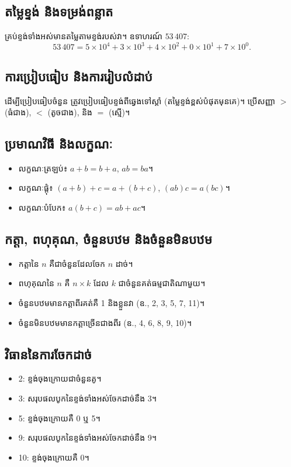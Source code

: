 \subsection{តម្លៃខ្ទង់ និងទម្រង់ពន្លាត}
គ្រប់ខ្ទង់ទាំងអស់មានតម្លៃតាមខ្ទង់របស់វា។ ឧទាហរណ៍ $53\,407$:
    \[
        53\,407 = 5\times10^4 + 3\times10^3 + 4\times10^2 + 0\times10^1 + 7\times10^0.
    \]

\subsection{ការប្រៀបធៀប និងការរៀបលំដាប់}
ដើម្បីប្រៀបធៀបចំនួន ត្រូវប្រៀបធៀបខ្ទង់ពីឆ្វេងទៅស្តាំ (តម្លៃខ្ទង់ខ្ពស់បំផុតមុនគេ)។ ប្រើសញ្ញា $>$ (ធំជាង), $<$ (តូចជាង), និង $=$ (ស្មើ)។

\subsection{ប្រមាណវិធី និងលក្ខណៈ}
    \begin{itemize}[label=---,nosep]
        \item លក្ខណៈត្រឡប់៖ $a+b=b+a$, $ab=ba$។
        \item លក្ខណៈផ្ដុំ៖ $(a+b)+c=a+(b+c)$, $(ab)c=a(bc)$។
        \item លក្ខណៈបំបែក៖ $a(b+c)=ab+ac$។
    \end{itemize}

\subsection{កត្តា, ពហុគុណ, ចំនួនបឋម និងចំនួនមិនបឋម}
    \begin{itemize}[label=---,nosep]
        \item កត្តានៃ $n$ គឺជាចំនួនដែលចែក $n$ ដាច់។
        \item ពហុគុណនៃ $n$ គឺ $n\times k$ ដែល $k$ ជាចំនួនគត់ធម្មជាតិណាមួយ។
        \item ចំនួនបឋមមានកត្តាពីរគត់គឺ 1 និងខ្លួនវា (ឧ., 2, 3, 5, 7, 11)។
        \item ចំនួនមិនបឋមមានកត្តាច្រើនជាងពីរ (ឧ., 4, 6, 8, 9, 10)។
    \end{itemize}

\subsection{វិធាននៃការចែកដាច់}
    \begin{itemize}[label=---]
        \item 2: ខ្ទង់ចុងក្រោយជាចំនួនគូ។
        \item 3: សរុបផលបូកនៃខ្ទង់ទាំងអស់ចែកដាច់នឹង 3។
        \item 5: ខ្ទង់ចុងក្រោយគឺ 0 ឬ 5។
        \item 9: សរុបផលបូកនៃខ្ទង់ទាំងអស់ចែកដាច់នឹង 9។
        \item 10: ខ្ទង់ចុងក្រោយគឺ 0។
    \end{itemize}

